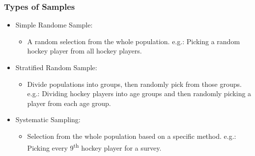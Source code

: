 \documentclass{beamer}
\begin{document}
    \begin{frame}
        \frametitle{Types of Samples}
        \begin{itemize}
            \item Simple Randome Sample:
            \begin{itemize}
                \item[] A random selection from the whole population.
                \newline e.g.: Picking a random hockey player from all hockey players. \newline 
            \end{itemize}
            \pause
            \item Stratified Random Sample:
            \begin{itemize}
                \item[] Divide populations into groups, then randomly pick from those groups. \newline
                e.g.: Dividing hockey players into age groups and then randomly picking a player 
                    from each age group. \newline
            \end{itemize}
            \pause
            \item Systematic Sampling:
            \begin{itemize}
                \item[] Selection from the whole population based on a specific method. \newline
                    e.g.: Picking every 9\textsuperscript{th} hockey player for a survey.
            \end{itemize}
        \end{itemize}
    \end{frame}
\end{document}
